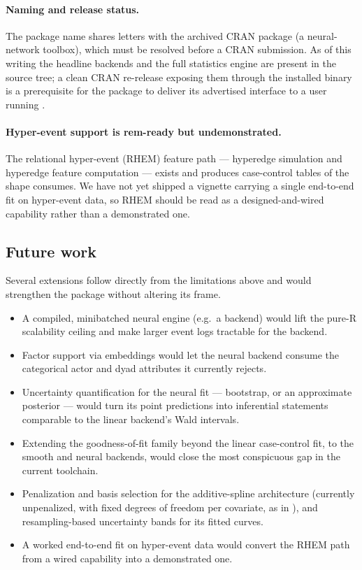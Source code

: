 \paragraph{Naming and release status.} The package name shares letters with the
archived CRAN package  (a neural-network toolbox), which must be
resolved before a CRAN submission. As of this writing the headline backends and
the full statistics engine are present in the source tree; a clean CRAN
re-release exposing them through the installed binary is a prerequisite for the
package to deliver its advertised interface to a user running
.

\paragraph{Hyper-event support is rem-ready but undemonstrated.} The relational
hyper-event (RHEM) feature path --- hyperedge simulation and hyperedge feature
computation --- exists and produces case-control tables of the shape
 consumes. We have not yet shipped a vignette carrying a single
end-to-end  fit on hyper-event data, so RHEM should be read as a
designed-and-wired capability rather than a demonstrated one.

\subsection{Future work}
\label{sec:disc-future}

Several extensions follow directly from the limitations above and would
strengthen the package without altering its frame.

\begin{itemize}
  \item A compiled, minibatched neural engine (e.g.\ a  backend)
        would lift the pure-R scalability ceiling and make larger event logs
        tractable for the  backend.
  \item Factor support via embeddings would let the neural backend consume the
        categorical actor and dyad attributes it currently rejects.
  \item Uncertainty quantification for the neural fit --- bootstrap, or an
        approximate posterior --- would turn its point predictions into
        inferential statements comparable to the linear backend's Wald intervals.
  \item Extending the goodness-of-fit family beyond the linear case-control fit,
        to the smooth and neural backends, would close the most conspicuous gap
        in the current toolchain.
  \item Penalization and basis selection for the additive-spline
        architecture (currently unpenalized, with fixed degrees of freedom per
        covariate, as in \citealp{filippimazzola2024}), and resampling-based
        uncertainty bands for its fitted curves.
  \item A worked end-to-end  fit on hyper-event data would convert the
        RHEM path from a wired capability into a demonstrated one.
\end{itemize}

